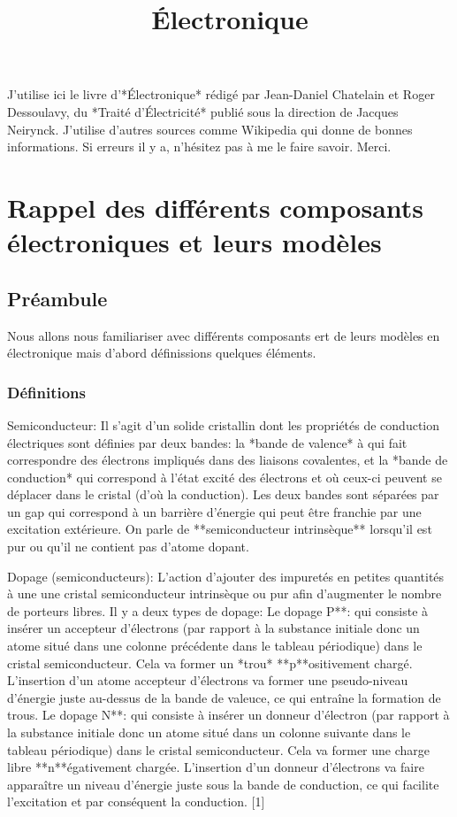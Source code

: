 
    \title{Électronique}
    J'utilise ici le livre d'*Électronique* rédigé par Jean-Daniel Chatelain et Roger Dessoulavy, du *Traité d'Électricité* publié sous la direction de Jacques Neirynck. J'utilise d'autres sources comme Wikipedia qui donne de bonnes informations. Si erreurs il y a, n'hésitez pas à me le faire savoir. Merci.

    \section{Rappel des différents composants électroniques et leurs modèles}

        \subsection{Préambule}
            Nous allons nous familiariser avec différents composants ert de leurs modèles en électronique mais d'abord définissions quelques éléments.

        \subsubsection{Définitions}
        \begin{list}
            \item Semiconducteur: Il s'agit d'un solide cristallin dont les propriétés de conduction électriques sont définies par deux bandes: la *bande de valence* à qui fait correspondre des électrons impliqués dans des liaisons covalentes, et la *bande de conduction* qui correspond à l'état excité des électrons et où ceux-ci peuvent se déplacer dans le cristal (d'où la conduction). Les deux bandes sont séparées par un gap qui correspond à un barrière d'énergie qui peut être franchie par une excitation extérieure. On parle de **semiconducteur intrinsèque** lorsqu'il est pur ou qu'il ne contient pas d'atome dopant.
            \item Dopage (semiconducteurs): L'action d'ajouter des impuretés en petites quantités à une une cristal semiconducteur intrinsèque ou pur afin d'augmenter le nombre de porteurs libres. Il y a deux types de dopage:
                \subitem  Le dopage P**: qui consiste à insérer un accepteur d'électrons (par rapport à la substance initiale donc un atome situé dans une colonne précédente dans le tableau périodique) dans le cristal semiconducteur. Cela va former un *trou* **p**ositivement chargé. L'insertion d'un atome accepteur d'électrons va former une pseudo-niveau d'énergie juste au-dessus de la bande de valeuce, ce qui entraîne la formation de trous.
                \subitem  Le dopage N**: qui consiste à insérer un donneur d'électron (par rapport à la substance initiale donc un atome situé dans un colonne suivante dans le tableau périodique) dans le cristal semiconducteur. Cela va former une charge libre **n**égativement chargée. L'insertion d'un donneur d'électrons va faire apparaître un niveau d'énergie juste sous la bande de conduction, ce qui facilite l'excitation et par conséquent la conduction. [1]
        \end{list}

